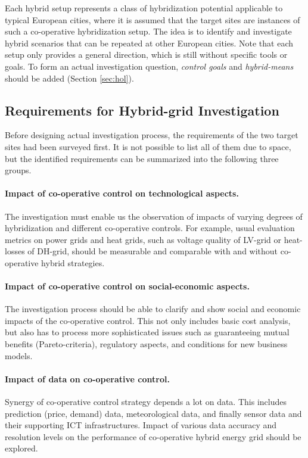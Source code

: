 \documentclass[a4paper,twoside]{article}
\begin{document}
Each hybrid setup represents a class of hybridization potential
applicable to typical European cities, where it is assumed that the
target sites are instances of such a co-operative hybridization setup. 
The idea is to identify and investigate hybrid scenarios that can be
repeated at other European cities. Note that each setup only provides
a general direction, which is still without specific tools or
goals. To form an actual investigation question,  {\em control
  goals} and {\em hybrid-means} should be added (Section
\ref{sec:hol}). 

\subsection{Requirements for Hybrid-grid Investigation}
\label{sec:req-2}
\noindent
Before designing actual investigation process, the requirements of the
two target sites had been surveyed first. 
It is not possible to list all of them due to space, but the
identified requirements can be summarized into the following three
groups.  

\paragraph{Impact of co-operative control on technological aspects.}
\noindent
The investigation must enable us the observation of impacts of
varying degrees of hybridization and different co-operative
controls. For example, usual evaluation metrics on power grids and
heat grids, such as voltage quality of LV-grid or heat-losses of
DH-grid, should be measurable and comparable with and without
co-operative hybrid strategies. 

\paragraph{Impact of co-operative control on social-economic aspects.} 
\noindent
The investigation process should be able to clarify and show social
and economic impacts of the co-operative control. This not only
includes basic cost analysis, but also has to process more
sophisticated issues such as guaranteeing mutual benefits
(Pareto-criteria), regulatory aspects, and conditions for new business
models. 

\paragraph{Impact of data on co-operative control.}
\noindent
Synergy of co-operative control strategy depends a lot on data. 
This includes prediction (price, demand) data, meteorological data,
and finally sensor data and their supporting ICT
infrastructures. Impact of various data accuracy and resolution levels 
on the performance of co-operative hybrid energy grid should be
explored. 
\end{document}
